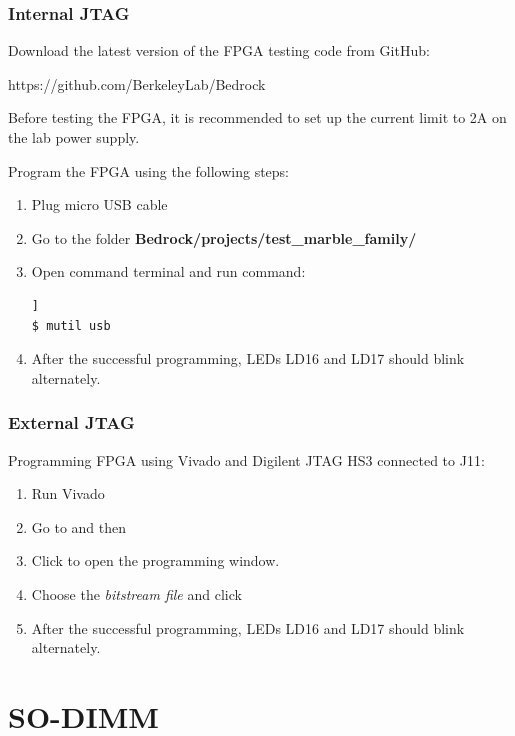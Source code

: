 \documentclass[12pt,oneside,a4]{article}
\begin{document}
\subsubsection{Internal JTAG}
Download the latest version of the FPGA testing code from GitHub:
\begin{leftbar}
https://github.com/BerkeleyLab/Bedrock
\end{leftbar}

\begin{leftbar}
Before testing the FPGA, it is recommended to set up the current limit to 2A on the lab power supply.
\end{leftbar}

Program the FPGA using the following steps:
\begin{enumerate}
	\item Plug micro USB cable
	\item Go to the folder \textbf{Bedrock/projects/test\_marble\_family/}
	\item Open command terminal and run command:
	\begin{lstlisting}[backgroundcolor = \color{Gainsboro}, language=bash, frame=none]]
$ mutil usb
	\end{lstlisting}
	\item After the successful programming, LEDs LD16 and LD17 should blink alternately.
\end{enumerate}

\subsubsection{External JTAG}
Programming FPGA using Vivado and Digilent JTAG HS3 connected to J11:
\begin{enumerate}
		\item Run Vivado
		\item Go to  and then  
		\item Click  to open the programming window.
		\item Choose the \textit{bitstream file} and click 

	\item After the successful programming, LEDs LD16 and LD17 should blink alternately.
\end{enumerate}

\section{SO-DIMM}
\end{document}
